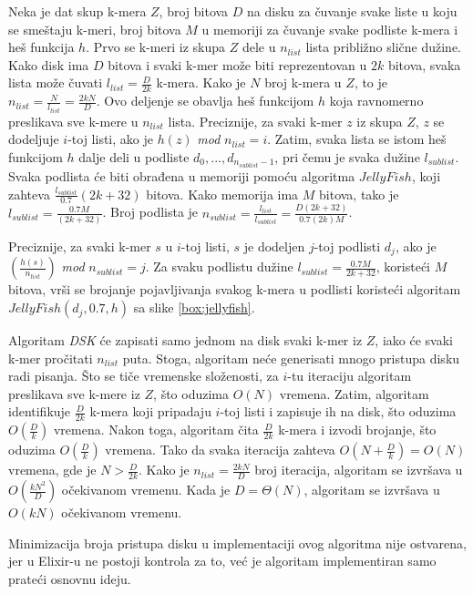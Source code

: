 \documentclass[12pt,oneside]{memoir}
\begin{document}
\newpage

Neka je dat skup k-mera $Z$, broj bitova $D$ na disku za čuvanje svake liste u koju se smeštaju k-meri, broj bitova $M$ u memoriji za čuvanje svake podliste k-mera i heš funkcija $h$. Prvo se k-meri iz skupa $Z$ dele u $n_{list}$ lista približno slične dužine. Kako disk ima $D$ bitova i svaki k-mer može biti reprezentovan u $2k$ bitova, svaka lista može čuvati $l_{list} =  \frac{D}{2k}$ k-mera. Kako je $N$ broj k-mera u $Z$, to je $n_{list} = \frac{N}{l_{list}} = \frac{2kN}{D}$. Ovo deljenje se obavlja heš funkcijom $h$ koja ravnomerno preslikava sve k-mere u $n_{list}$ lista. Preciznije, za svaki k-mer $z$ iz skupa $Z$, $z$ se dodeljuje $i$-toj listi, ako je $h(z)$ \textit{mod} $n_{list} = i$. Zatim, svaka lista se istom heš funkcijom $h$ dalje deli u podliste ${d_0,..., d_{n_{sublist} - 1}}$, pri čemu je svaka dužine $l_{sublist}$. Svaka podlista će biti obrađena u memoriji pomoću algoritma $JellyFish$, koji zahteva $\frac{l_{sublist}}{0.7}(2k +32)$ bitova. Kako memorija ima $M$ bitova, tako je $l_{sublist} = \frac{0.7M}{(2k + 32)}$. Broj podlista je  $n_{sublist} = \frac{l_{list}}{l_{sublist}} = \frac{D(2k + 32)}{0.7(2k)M}$. 

Preciznije, za svaki k-mer $s$ u $i$-toj listi, $s$ je dodeljen $j$-toj podlisti $d_j$, ako je $(\frac{h(s)}{n_{list}})$ \textit{mod} $n_{sublist} = j$. Za svaku podlistu dužine $l_{sublist} = \frac{0.7M}{2k + 32}$, koristeći $M$ bitova, vrši se brojanje pojavljivanja svakog k-mera u podlisti koristeći algoritam $JellyFish(d_j, 0.7, h)$ sa slike \ref{box:jellyfish}.

Algoritam \textit{DSK} će zapisati samo jednom na disk svaki k-mer iz $Z$, iako će svaki k-mer pročitati $n_{list}$ puta. Stoga, algoritam neće generisati mnogo pristupa disku radi pisanja. Što se tiče vremenske složenosti, za $i$-tu iteraciju algoritam preslikava sve k-mere iz $Z$, što oduzima $O(N)$ vremena. Zatim, algoritam identifikuje $\frac{D}{2k}$ k-mera koji pripadaju $i$-toj listi i zapisuje ih na disk, što oduzima $O(\frac{D}{k})$ vremena. Nakon toga, algoritam  čita $\frac{D}{2k}$ k-mera i izvodi brojanje, što oduzima $O(\frac{D}{k})$ vremena. Tako da svaka iteracija zahteva $O(N + \frac{D}{k}) = O(N)$ vremena, gde je $N > \frac{D}{2k}$. Kako je $n_{list} = \frac{2kN}{D}$ broj iteracija, algoritam se izvršava u $O(\frac{kN^2}{D})$ očekivanom vremenu. Kada je $D = \Theta(N)$, algoritam se izvršava u $O(kN)$ očekivanom vremenu.

Minimizacija broja pristupa disku u implementaciji ovog algoritma nije ostvarena, jer u Elixir-u ne postoji kontrola za to, već je algoritam implementiran samo prateći osnovnu ideju.
\end{document}
